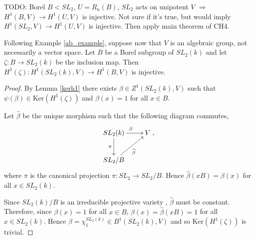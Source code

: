\begin{remark}
TODO: Borel $B < SL_2$, $U = R_u(B)$, $SL_2$ acts on unipotent $V$ $\Rightarrow$ $H^1(B, V) \rightarrow H^1(U, V)$ is injective. Not sure if it's true, but would imply $H^1(SL_2, V) \rightarrow H^1(U, V)$ is injective. Then apply main theorem of CH4.
\end{remark}

\begin{lemma} Following Example \ref{ab_example}, suppose now that $V$ is an algebraic group, not necessarily a vector space. Let $B$ be a Borel subgroup of $SL_2(k)$ and let $\zeta: B \rightarrow SL_2(k)$ be the inclusion map. Then $H^1(\zeta): H^1(SL_2(k), V)\rightarrow H^1(B, V)$ is injective.
  \label{sl2_b_inj}
\end{lemma}
\begin{proof}
By Lemma \ref{kerh1} there exists $\beta \in Z^1(SL_2(k), V)$ such that $\psi(\beta) \in \mathrm{Ker}\left(H^1(\zeta)\right)$ and $\beta(x) = 1$ for all $x \in B$.

Let $\widehat{\beta}$ be the unique morphism such that the following diagram commutes,
\begin{align*}
	\xymatrix{
	SL_2(k) \ar[r]^{\beta} \ar[d]_{\pi} & V\\
	SL_2/B \ar[ru]_{\widehat{\beta}}
	},
\end{align*}
where $\pi$ is the canonical projection $\pi:SL_2 \rightarrow SL_2/B$. Hence $\widehat{\beta}(xB) = \beta(x)$ for all $x \in SL_2(k)$.

Since $SL_2(k)/B$ is an irreducible projective variety \cite[Theorem 21.3]{humphreys1975linear}, $\widehat{\beta}$ must be constant. Therefore, since $\beta(x) = 1$ for all $x \in B$, $\beta(x) = \widehat{\beta}(xB) = 1$ for all $x \in SL_2(k)$. Hence $\beta = \chi^{SL_2(k)}_1 \in B^1(SL_2(k), V)$ and so $\mathrm{Ker}\left(H^1(\zeta)\right)$ is trivial.
\end{proof} 

